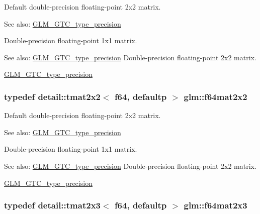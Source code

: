 Default double-precision floating-point 2x2 matrix. \begin{Desc}
\item[See also:]\hyperlink{group__gtc__type__precision}{GLM\_\-GTC\_\-type\_\-precision}\end{Desc}
Double-precision floating-point 1x1 matrix. \begin{Desc}
\item[See also:]\hyperlink{group__gtc__type__precision}{GLM\_\-GTC\_\-type\_\-precision} Double-precision floating-point 2x2 matrix. 

\hyperlink{group__gtc__type__precision}{GLM\_\-GTC\_\-type\_\-precision} \end{Desc}
\hypertarget{group__gtc__type__precision_gd125d405392e76f26f359798350fb64f}{
\subsubsection[f64mat2x2]{\setlength{\rightskip}{0pt plus 5cm}typedef detail::tmat2x2$<$ f64, defaultp $>$ {\bf glm::f64mat2x2}}}
\label{group__gtc__type__precision_gd125d405392e76f26f359798350fb64f}


Default double-precision floating-point 2x2 matrix. \begin{Desc}
\item[See also:]\hyperlink{group__gtc__type__precision}{GLM\_\-GTC\_\-type\_\-precision}\end{Desc}
Double-precision floating-point 1x1 matrix. \begin{Desc}
\item[See also:]\hyperlink{group__gtc__type__precision}{GLM\_\-GTC\_\-type\_\-precision} Double-precision floating-point 2x2 matrix. 

\hyperlink{group__gtc__type__precision}{GLM\_\-GTC\_\-type\_\-precision} \end{Desc}
\hypertarget{group__gtc__type__precision_g5b665390818b04bdd95bb6b2a25e5c2c}{
\subsubsection[f64mat2x3]{\setlength{\rightskip}{0pt plus 5cm}typedef detail::tmat2x3$<$ f64, defaultp $>$ {\bf glm::f64mat2x3}}}
\label{group__gtc__type__precision_g5b665390818b04bdd95bb6b2a25e5c2c}


